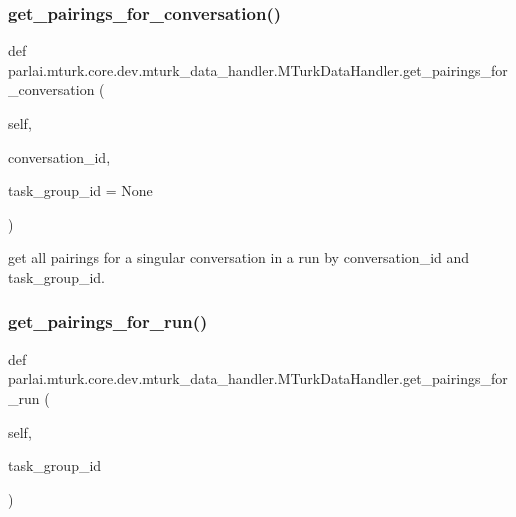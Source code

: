 \subsubsection{\texorpdfstring{get\+\_\+pairings\+\_\+for\+\_\+conversation()}{get\_pairings\_for\_conversation()}}
{\footnotesize\ttfamily def parlai.\+mturk.\+core.\+dev.\+mturk\+\_\+data\+\_\+handler.\+M\+Turk\+Data\+Handler.\+get\+\_\+pairings\+\_\+for\+\_\+conversation (\begin{DoxyParamCaption}\item[{}]{self,  }\item[{}]{conversation\+\_\+id,  }\item[{}]{task\+\_\+group\+\_\+id = {\ttfamily None} }\end{DoxyParamCaption})}

\begin{DoxyVerb}get all pairings for a singular conversation in a run by conversation_id and
task_group_id.
\end{DoxyVerb}
 \mbox{\label{classparlai_1_1mturk_1_1core_1_1dev_1_1mturk__data__handler_1_1MTurkDataHandler_aac09cee0791b834add5a50e430b6030e}} 
\subsubsection{\texorpdfstring{get\+\_\+pairings\+\_\+for\+\_\+run()}{get\_pairings\_for\_run()}}
{\footnotesize\ttfamily def parlai.\+mturk.\+core.\+dev.\+mturk\+\_\+data\+\_\+handler.\+M\+Turk\+Data\+Handler.\+get\+\_\+pairings\+\_\+for\+\_\+run (\begin{DoxyParamCaption}\item[{}]{self,  }\item[{}]{task\+\_\+group\+\_\+id }\end{DoxyParamCaption})}


